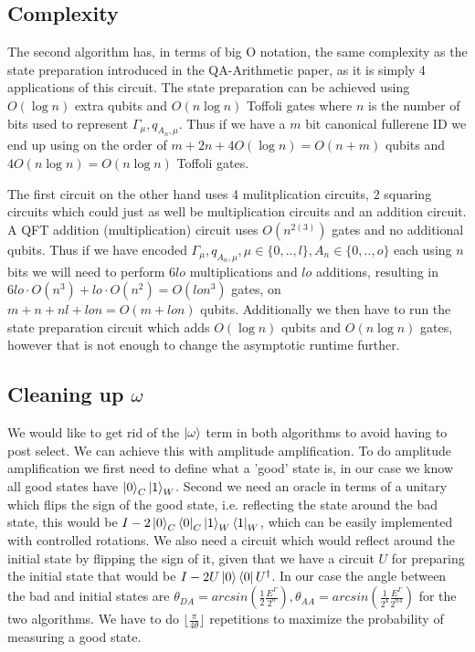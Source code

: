 \documentclass{article}
\begin{document}
\subsection{Complexity}
The second algorithm has, in terms of big O notation, the same complexity as the state preparation introduced in the QA-Arithmetic paper, as it is simply 4 applications of this circuit. The state preparation can be achieved using $O(\log n)$ extra qubits and $O(n\log n)$ Toffoli gates where $n$ is the number of bits used to represent $\varGamma_\mu, q_{A_n,\mu}$. Thus if we have a $m$ bit canonical fullerene ID we end up using on the order of $m+2n+4O(\log n)=O(n+m)$ qubits and $4O(n \log n)=O(n \log n)$ Toffoli gates. 

The first circuit on the other hand uses 4 mulitplication circuits, 2 squaring circuits which could just as well be multiplication circuits and an addition circuit. A QFT addition (multiplication) circuit uses $O(n^{2(3)})$ gates and no additional qubits. Thus if we have encoded $\varGamma_{\mu},q_{A_n,\mu}, \mu \in \{0,..,l\}, A_n \in \{0,..,o\}$ each using $n$ bits we will need to perform $6lo$ multiplications and $lo$ additions, resulting in $6lo\cdot O(n^3)+lo\cdot O(n^2)=O(lon^3)$ gates, on $m+n+nl+lon = O(m+lon)$ qubits.
Additionally we then have to run the state preparation circuit which adds $O(\log n)$ qubits and $O(n\log n)$ gates, however that is not enough to change the asymptotic runtime further. 

\subsection{Cleaning up $\omega$}
We would like to get rid of the $\ket{\omega}$ term in both algorithms to avoid having to post select.
We can achieve this with amplitude amplification. 
To do amplitude amplification we first need to define what a 'good' state is, in our case we know all good states have $\ket{0}_C\ket{1}_W$. 
Second we need an oracle in terms of a unitary which flips the sign of the good state, i.e. reflecting the state around the bad state, this would be $I-2\ket{0}_C\bra{0}_C\ket{1}_W\bra{1}_W$, which can be easily implemented with controlled rotations. 
We also need a circuit which would reflect around the initial state by flipping the sign of it, given that we have a circuit $U$ for preparing the initial state that would be $I-2U\ket{0}\bra{0}U^\dagger$.
In our case the angle between the bad and initial states are $\theta_{DA} = arcsin(\frac{1}{2}\frac{E^\Gamma}{2^n}),\theta_{AA} = arcsin(\frac{1}{2^4}\frac{E^\Gamma}{2^{n4}})$ for the two algorithms. We have to do $\lfloor\frac{\pi}{4\theta}\rfloor$ repetitions to maximize the probability of measuring a good state.%
\end{document}
